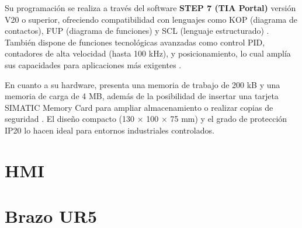 Su programación se realiza a través del software \textbf{STEP 7 (TIA Portal)} versión V20 o superior, ofreciendo compatibilidad con lenguajes como KOP (diagrama de contactos), FUP (diagrama de funciones) y SCL (lenguaje estructurado) \cite{PLC_siemens}. También dispone de funciones tecnológicas avanzadas como control PID, contadores de alta velocidad (hasta 100 kHz), y posicionamiento, lo cual amplía sus capacidades para aplicaciones más exigentes \cite{PLC_siemens}.

En cuanto a su hardware, presenta una memoria de trabajo de 200 kB y una memoria de carga de 4 MB, además de la posibilidad de insertar una tarjeta SIMATIC Memory Card para ampliar almacenamiento o realizar copias de seguridad \cite{PLC_siemens}. El diseño compacto (130 × 100 × 75 mm) y el grado de protección IP20 lo hacen ideal para entornos industriales controlados.

\section{HMI}

\section{Brazo UR5}





